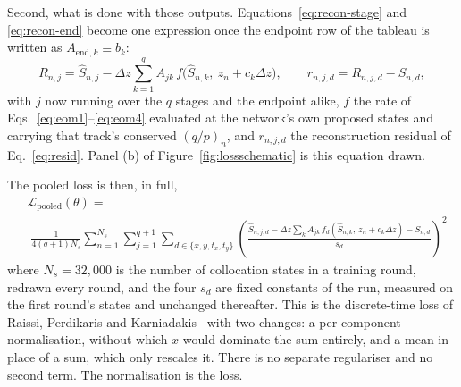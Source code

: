 \documentclass[11pt,a4paper]{article}
\begin{document}
Second, what is done with those outputs. Equations~\eqref{eq:recon-stage} and
\eqref{eq:recon-end} become one expression once the endpoint row of the tableau
is written as $A_{\mathrm{end},k} \equiv b_k$:
%
\begin{equation}
  R_{n,j} = \hat{S}_{n,j}
    - \Delta z \sum_{k=1}^{q} A_{jk}\,
      f\!\big(\hat{S}_{n,k},\ z_n + c_k \Delta z\big),
  \qquad
  r_{n,j,d} = R_{n,j,d} - S_{n,d},
  \label{eq:recon-all}
\end{equation}
%
with $j$ now running over the $q$ stages and the endpoint alike, $f$ the rate
of Eqs.~\eqref{eq:eom1}--\eqref{eq:eom4} evaluated at the network's own
proposed states and carrying that track's conserved $(q/p)_n$, and $r_{n,j,d}$
the reconstruction residual of Eq.~\eqref{eq:resid}. Panel (b) of
Figure~\ref{fig:lossschematic} is this equation drawn.

The pooled loss is then, in full,
%
\begin{equation}
  \boxed{\;
  \begin{aligned}
    &\mathcal{L}_{\mathrm{pooled}}(\theta) = \\[2pt]
    &\; \frac{1}{4(q+1)N_s}
      \sum_{n=1}^{N_s} \sum_{j=1}^{q+1}
      \sum_{d \in \{x, y, t_x, t_y\}}
      \left(\frac{\hat{S}_{n,j,d}
        - \Delta z \sum_{k} A_{jk}\,
          f_d(\hat{S}_{n,k},\, z_n + c_k \Delta z)
        - S_{n,d}}{s_d}\right)^{\!2}
  \end{aligned}\;}
  \label{eq:pooled-full}
\end{equation}
%
where $N_s = 32{,}000$ is the number of collocation states in a training round,
redrawn every round, and the four $s_d$ are fixed constants of the run,
measured on the first round's states and unchanged thereafter. This is the
discrete-time loss of Raissi, Perdikaris and
Karniadakis~\citep[\S3]{raissi2019} with two changes: a per-component
normalisation, without which $x$ would dominate the sum entirely, and a mean in
place of a sum, which only rescales it. There is no separate regulariser and no
second term. The normalisation is the loss.
\end{document}
